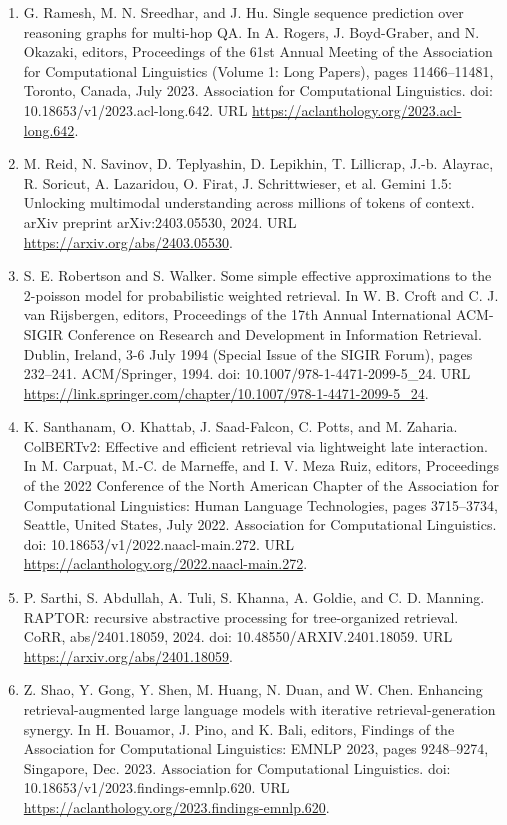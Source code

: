 \documentclass[11pt,UTF8,fontset=fandol]{ctexart}
\begin{document}
\begin{enumerate}[leftmargin=2em]
\item G. Ramesh, M. N. Sreedhar, and J. Hu. Single sequence prediction over reasoning graphs for multi-hop QA. In A. Rogers, J. Boyd-Graber, and N. Okazaki, editors, Proceedings of the 61st Annual Meeting of the Association for Computational Linguistics (Volume 1: Long Papers), pages 11466--11481, Toronto, Canada, July 2023. Association for Computational Linguistics. doi: 10.18653/v1/2023.acl-long.642. URL \url{https://aclanthology.org/2023.acl-long.642}.
\item M. Reid, N. Savinov, D. Teplyashin, D. Lepikhin, T. Lillicrap, J.-b. Alayrac, R. Soricut, A. Lazaridou, O. Firat, J. Schrittwieser, et al. Gemini 1.5: Unlocking multimodal understanding across millions of tokens of context. arXiv preprint arXiv:2403.05530, 2024. URL \url{https://arxiv.org/abs/2403.05530}.
\item S. E. Robertson and S. Walker. Some simple effective approximations to the 2-poisson model for probabilistic weighted retrieval. In W. B. Croft and C. J. van Rijsbergen, editors, Proceedings of the 17th Annual International ACM-SIGIR Conference on Research and Development in Information Retrieval. Dublin, Ireland, 3-6 July 1994 (Special Issue of the SIGIR Forum), pages 232--241. ACM/Springer, 1994. doi: 10.1007/978-1-4471-2099-5\_24. URL \url{https://link.springer.com/chapter/10.1007/978-1-4471-2099-5_24}.
\item K. Santhanam, O. Khattab, J. Saad-Falcon, C. Potts, and M. Zaharia. ColBERTv2: Effective and efficient retrieval via lightweight late interaction. In M. Carpuat, M.-C. de Marneffe, and I. V. Meza Ruiz, editors, Proceedings of the 2022 Conference of the North American Chapter of the Association for Computational Linguistics: Human Language Technologies, pages 3715--3734, Seattle, United States, July 2022. Association for Computational Linguistics. doi: 10.18653/v1/2022.naacl-main.272. URL \url{https://aclanthology.org/2022.naacl-main.272}.
\item P. Sarthi, S. Abdullah, A. Tuli, S. Khanna, A. Goldie, and C. D. Manning. RAPTOR: recursive abstractive processing for tree-organized retrieval. CoRR, abs/2401.18059, 2024. doi: 10.48550/ARXIV.2401.18059. URL \url{https://arxiv.org/abs/2401.18059}.
\item Z. Shao, Y. Gong, Y. Shen, M. Huang, N. Duan, and W. Chen. Enhancing retrieval-augmented large language models with iterative retrieval-generation synergy. In H. Bouamor, J. Pino, and K. Bali, editors, Findings of the Association for Computational Linguistics: EMNLP 2023, pages 9248--9274, Singapore, Dec. 2023. Association for Computational Linguistics. doi: 10.18653/v1/2023.findings-emnlp.620. URL \url{https://aclanthology.org/2023.findings-emnlp.620}.

\end{enumerate}
\end{document}
